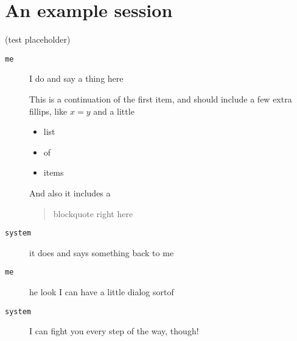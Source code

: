 \section{An example session}\hypertarget{an-example-session}{}\label{an-example-session}

(test placeholder)

\begin{description}
\item[{\tt me}] I do and say a thing here


This is a continuation of the first item, and should include a few extra fillips, like $x=y$ and a little

\begin{itemize}
\item list
\item of
\item items
\end{itemize}

And also it includes a

\begin{quote}
blockquote right here
\end{quote}


\item[{\tt system}] it does and says something back to me



\item[{\tt me}] he look I can have a little dialog sortof



\item[{\tt system}] I can fight you every step of the way, though!
\end{description}
